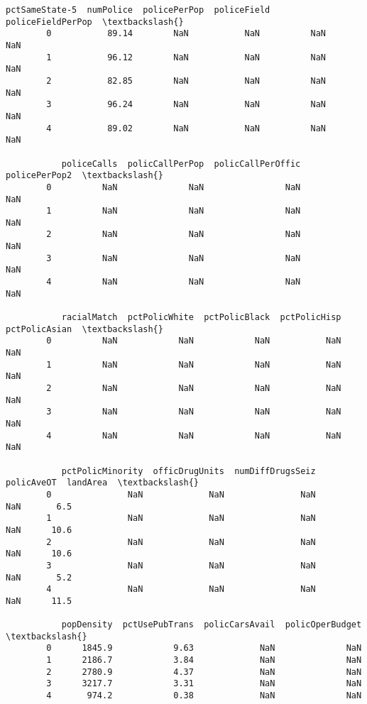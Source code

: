 \documentclass[11pt]{llncs}
\begin{document}
\begin{Verbatim}[commandchars=\\\{\}]
           pctSameState-5  numPolice  policePerPop  policeField  policeFieldPerPop  \textbackslash{}
        0           89.14        NaN           NaN          NaN                NaN   
        1           96.12        NaN           NaN          NaN                NaN   
        2           82.85        NaN           NaN          NaN                NaN   
        3           96.24        NaN           NaN          NaN                NaN   
        4           89.02        NaN           NaN          NaN                NaN   
        
           policeCalls  policCallPerPop  policCallPerOffic  policePerPop2  \textbackslash{}
        0          NaN              NaN                NaN            NaN   
        1          NaN              NaN                NaN            NaN   
        2          NaN              NaN                NaN            NaN   
        3          NaN              NaN                NaN            NaN   
        4          NaN              NaN                NaN            NaN   
        
           racialMatch  pctPolicWhite  pctPolicBlack  pctPolicHisp  pctPolicAsian  \textbackslash{}
        0          NaN            NaN            NaN           NaN            NaN   
        1          NaN            NaN            NaN           NaN            NaN   
        2          NaN            NaN            NaN           NaN            NaN   
        3          NaN            NaN            NaN           NaN            NaN   
        4          NaN            NaN            NaN           NaN            NaN   
        
           pctPolicMinority  officDrugUnits  numDiffDrugsSeiz  policAveOT  landArea  \textbackslash{}
        0               NaN             NaN               NaN         NaN       6.5   
        1               NaN             NaN               NaN         NaN      10.6   
        2               NaN             NaN               NaN         NaN      10.6   
        3               NaN             NaN               NaN         NaN       5.2   
        4               NaN             NaN               NaN         NaN      11.5   
        
           popDensity  pctUsePubTrans  policCarsAvail  policOperBudget  \textbackslash{}
        0      1845.9            9.63             NaN              NaN   
        1      2186.7            3.84             NaN              NaN   
        2      2780.9            4.37             NaN              NaN   
        3      3217.7            3.31             NaN              NaN   
        4       974.2            0.38             NaN              NaN   
        

\end{Verbatim}
\end{document}
